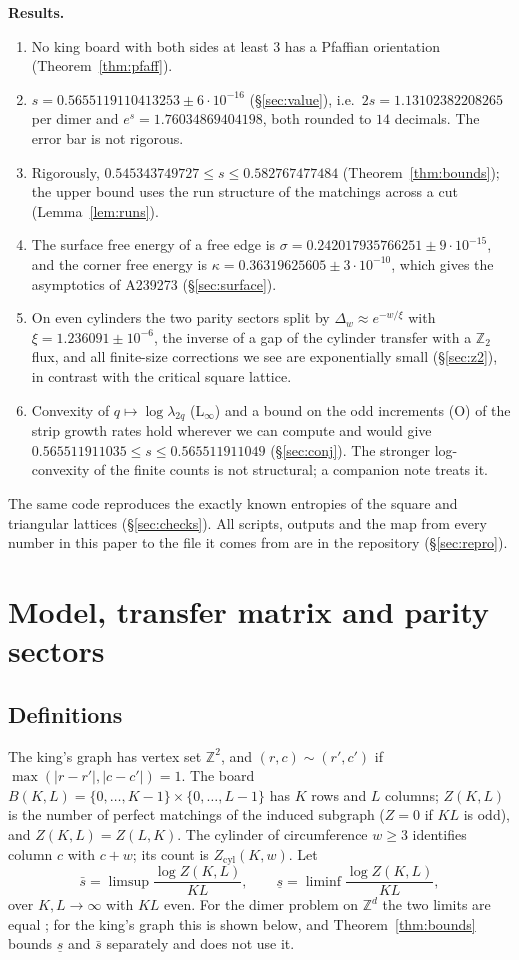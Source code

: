 \documentclass[11pt]{amsart}
\theoremstyle{definition}
\theoremstyle{remark}
\newcommand{\Z}{\mathbb{Z}}
\begin{document}
\medskip\noindent\textbf{Results.}
\begin{enumerate}
\item No king board with both sides at least $3$ has a Pfaffian orientation
  (Theorem~\ref{thm:pfaff}).
\item $s = 0.5655119110413253 \pm 6\cdot10^{-16}$ (\S\ref{sec:value}), i.e.\ $2s = 1.13102382208265$
  per dimer and $e^{s} = 1.76034869404198$, both rounded to $14$ decimals. The error bar is not
  rigorous.
\item Rigorously, $0.545343749727 \le s \le 0.582767477484$ (Theorem~\ref{thm:bounds}); the upper bound
  uses the run structure of the matchings across a cut (Lemma~\ref{lem:runs}).
\item The surface free energy of a free edge is $\sigma = 0.242017935766251 \pm 9\cdot10^{-15}$, and
  the corner free energy is $\kappa = 0.36319625605 \pm 3\cdot10^{-10}$, which gives the
  asymptotics of A239273 (\S\ref{sec:surface}).
\item On even cylinders the two parity sectors split by $\Delta_w \approx e^{-w/\xi}$ with
  $\xi = 1.236091 \pm 10^{-6}$, the inverse of a gap of the cylinder transfer with a $\Z_2$ flux, and all finite-size corrections we see are exponentially small
  (\S\ref{sec:z2}), in contrast with the critical square lattice.
\item Convexity of $q \mapsto \log\lambda_{2q}$ (L$_\infty$) and a bound on the odd increments (O)
  of the strip growth rates hold wherever we can compute and would give
  $0.565511911035 \le s \le 0.565511911049$ (\S\ref{sec:conj}). The stronger log-convexity of the
  finite counts is not structural; a companion note \cite{rylko2026lnote} treats it.
\end{enumerate}
The same code reproduces the exactly known entropies of the square and triangular lattices
(\S\ref{sec:checks}). All scripts, outputs and the map from every number in this paper to the
file it comes from are in the repository (\S\ref{sec:repro}).

\section{Model, transfer matrix and parity sectors}\label{sec:model}

\subsection{Definitions}
The king's graph has vertex set $\Z^2$, and $(r, c) \sim (r', c')$ if
$\max(|r - r'|, |c - c'|) = 1$. The board $B(K, L) = \{0, \dots, K-1\} \times \{0, \dots, L-1\}$
has $K$ rows and $L$ columns; $Z(K, L)$ is the number of perfect matchings of the induced
subgraph ($Z = 0$ if $KL$ is odd), and $Z(K, L) = Z(L, K)$. The cylinder of circumference
$w \ge 3$ identifies column $c$ with $c + w$; its count is $Z_{\mathrm{cyl}}(K, w)$. Let
\[
  \bar s = \limsup \frac{\log Z(K, L)}{KL}, \qquad \underline s = \liminf \frac{\log Z(K, L)}{KL},
\]
over $K, L \to \infty$ with $KL$ even. For the dimer problem on $\Z^d$ the two limits are equal
\cite{friedlandpeled2005}; for the king's graph this is shown below, and
Theorem~\ref{thm:bounds} bounds $\underline s$ and $\bar s$ separately and does not use it.
\end{document}
